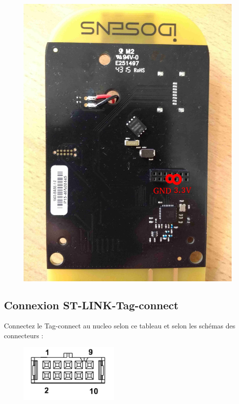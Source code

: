 \documentclass{article}
\begin{document}
\begin{figure}[H]
\begin{center}
\advance\leftskip-3cm
\advance\rightskip-3cm
\includegraphics[keepaspectratio=true,scale=0.1]{branchement_basepower2.jpg}
\label{visina8}
\end{center}\end{figure}



\subsection {Connexion ST-LINK-Tag-connect}

Connectez le Tag-connect au nucleo selon ce tableau et selon les schémas des connecteurs :

\begin{figure}[H]
\begin{center}
\advance\leftskip-3cm
\advance\rightskip-3cm
\includegraphics[keepaspectratio=true,scale=0.8]{tag_connectpinout.png}
\label{visina8}
\end{center}\end{figure}
\end{document}
